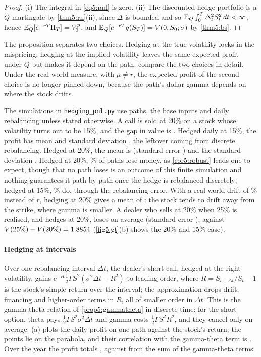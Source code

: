 \begin{chapterrefs}
\begin{proof}
(i) The integral in \cref{eq5:pnl} is zero. (ii) The discounted hedge portfolio is a $Q$-martingale by
\cref{thm5:rn}(ii), since $\Delta$ is bounded and so $\mathbb{E}_Q\int_0^T\Delta_t^2S_t^2\,dt<\infty$; hence
$\mathbb{E}_Q[e^{-rT}\Pi_T]=V^p_0$, and
$\mathbb{E}_Q[e^{-rT}g(S_T)]=V(0,S_0;\sigma)$ by \cref{thm5:bs}.
\end{proof}

The proposition separates two choices. Hedging at the true volatility locks in the mispricing; hedging
at the implied volatility leaves the same expected profit under $Q$ but makes it depend on the path.
\textcite{ahmad2005} compare the two choices in detail.
Under the real-world measure, with $\mu\ne r$, the expected profit of the second choice is no longer
pinned down, because the path's dollar gamma depends on where the stock drifts.

The simulations in \texttt{hedging\_pnl.py} use \hedgePaths{} paths, the base inputs and daily
rebalancing unless stated otherwise. A call is sold at 20\% on a stock
whose volatility turns out to be 15\%, and the gap in value is \volGap. Hedged daily at 15\%, the
profit has mean \wrongRealMean{} and standard deviation \wrongRealSd, the leftover coming from discrete
rebalancing. Hedged at 20\%, the mean is \wrongImpMean{} (standard error \wrongImpSE) and the standard
deviation \wrongImpSd. Hedged at 20\%, \wrongImpLoss\% of paths lose money, as \cref{cor5:robust} leads one
to expect, though that no path loses is an outcome of this finite simulation and nothing guarantees
it path by path once the hedge is rebalanced discretely; hedged at 15\%, \wrongRealLoss\% do, through the rebalancing error. With a real-world drift of \hedgeMu\% instead
of $r$, hedging at 20\% gives a mean of \wrongImpMeanDrift: the stock tends to drift away from the strike,
where gamma is smaller. A dealer who sells at 20\% when 25\% is realised, and hedges at 20\%, loses
\underLoss{} on average (standard error \underSE), against $V(25\%)-V(20\%)=1.8854$
(\cref{fig5:gt}(b) shows the 20\% and 15\% case).

\paragraph{Hedging at intervals}
Over one rebalancing interval $\Delta t$, the dealer's short call, hedged at the right volatility, gains
$e^{-rt}\tfrac12\Gamma S^2(\sigma^2\Delta t-R^2)$ to leading order, where $R=S_{t+\Delta t}/S_t-1$ is the
stock's simple return over the interval; the approximation drops drift, financing and higher-order
terms in $R$, all of smaller order in $\Delta t$. This is the gamma-theta relation of \cref{prop5:gammatheta} in discrete time: for the
short option, theta pays $\tfrac12\Gamma S^2\sigma^2\Delta t$ and gamma costs $\tfrac12\Gamma S^2R^2$,
and they cancel only on average. (a) plots the daily profit on one path against the stock's return; the points lie
on the parabola, and their correlation with the gamma-theta term is \gtStepCorr. Over the year the
profit totals \gtTotal, against \gtApprox{} from the sum of the gamma-theta terms.


\end{chapterrefs}
